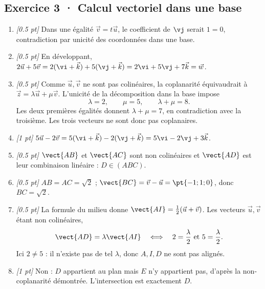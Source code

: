\subsection*{Exercice 3 · Calcul vectoriel dans une base}\begin{enumerate}

\item \textit{[\num{0,5} pt]} Dans une égalité $\vec v=t\vec u$, le coefficient de $\vj $ serait $1=0$, contradiction par unicité des coordonnées dans une base.

\item \textit{[\num{0,5} pt]} En développant, $2\vec u+5\vec v=2(\vi +\vec k)+5(\vj +\vec k)=2\vi +5\vj +7\vec k=\vec w$.

\item \textit{[\num{0,5} pt]} Comme $\vec u,\vec v$ ne sont pas colinéaires, la coplanarité équivaudrait à $\vec z=\lambda\vec u+\mu\vec v$. L'unicité de la décomposition dans la base impose
\[\lambda=2,\qquad\mu=5,\qquad\lambda+\mu=8.\]
Les deux premières égalités donnent $\lambda+\mu=7$, en contradiction avec la troisième. Les trois vecteurs ne sont donc pas coplanaires.

\item \textit{[1 pt]} $5\vec u-2\vec v=5(\vi +\vec k)-2(\vj +\vec k)=5\vi -2\vj +3\vec k$.

\item \textit{[\num{0,5} pt]} $\vect{AB}$ et $\vect{AC}$ sont non colinéaires et $\vect{AD}$ est leur combinaison linéaire : $D\in(ABC)$.

\item \textit{[\num{0,5} pt]} $AB=AC=\sqrt2$ ; $\vect{BC}=\vec v-\vec u=\pt{-1;1;0}$, donc $BC=\sqrt2$.

\item \textit{[\num{0,5} pt]} La formule du milieu donne $\vect{AI}=\frac12(\vec u+\vec v)$. Les vecteurs $\vec u,\vec v$ étant non colinéaires,
\[\vect{AD}=\lambda\vect{AI}\quad\Longleftrightarrow\quad 2=\frac{\lambda}{2}\ \text{et}\ 5=\frac{\lambda}{2}.\]
Ici $2\ne 5$ : il n'existe pas de tel $\lambda$, donc $A,I,D$ ne sont pas alignés.

\item \textit{[1 pt]} Non : $D$ appartient au plan mais $E$ n'y appartient pas, d'après la non-coplanarité démontrée. L'intersection est exactement $D$.

\end{enumerate}

